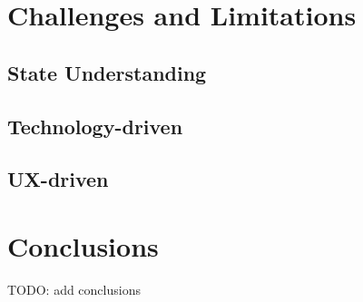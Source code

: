 \documentclass[journal]{vgtc}
\begin{document}
\section{Challenges and Limitations}
\subsection{State Understanding}
\subsection{Technology-driven}
\subsection{UX-driven}

\section{Conclusions}
TODO: add conclusions
\nocite{*}
\printbibliography
\end{document}
